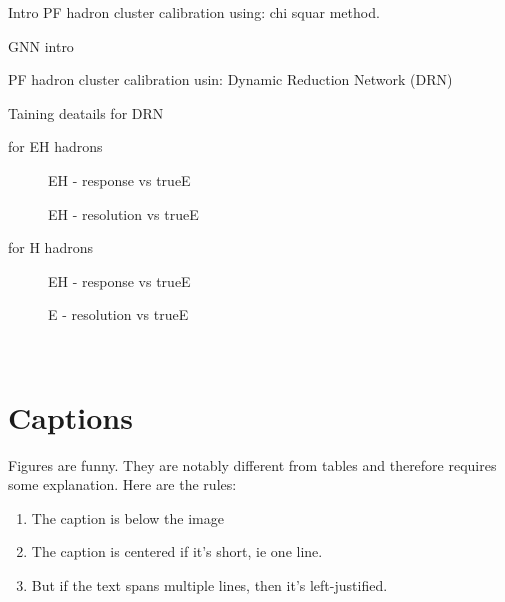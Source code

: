 
Intro PF hadron cluster calibration using: chi squar method.

GNN intro 

PF hadron cluster calibration usin: Dynamic Reduction Network (DRN)

Taining deatails for DRN 



for EH hadrons

\begin{figure}[ht]
\caption{EH - response vs trueE }
\end{figure}

\begin{figure}[ht]
\caption{EH - resolution vs trueE }
\end{figure}


for H hadrons 

\begin{figure}[ht]
\caption{EH - response vs trueE }
\end{figure}

\begin{figure}[ht]
\caption{E - resolution vs trueE }
\end{figure}~

\section{Captions}
Figures are funny. They are notably different from tables and therefore requires some explanation. Here are the rules:
\begin{enumerate}
\item The caption is below the image
\item The caption is centered if it's short, ie one line. 
\item But if the text spans multiple lines, then it's left-justified. 
\end{enumerate}

